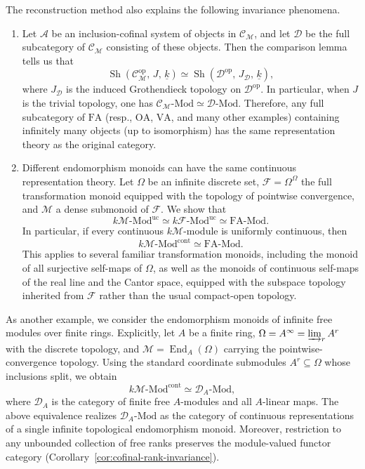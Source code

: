 \documentclass[10pt, reqno]{amsart}
\theoremstyle{plain}
\numberwithin{equation}{section}
\theoremstyle{definition}
\newcommand{\End}{\operatorname{End}}
\newcommand{\Sh}{\operatorname{Sh}}
\newcommand{\Mod}{{\textrm{-}\mathrm{Mod}}}
\newcommand{\op}{\mathrm{op}}
\newcommand{\FA}{\mathrm{FA}}
\newcommand{\M}{\mathscr M}
\newcommand{\C}{\mathscr C}
\newcommand{\D}{\mathscr D}
\begin{document}
The reconstruction method also explains the following invariance phenomena.
\begin{enumerate}
\item Let $\mathcal{A}$ be an inclusion-cofinal system of objects in $\C_\M$, and let $\D$ be the full subcategory of $\C_\M$ consisting of these objects. Then the comparison lemma tells us that
\[
\Sh(\C_\M^{\op}, \, J, \, \underline{k}) \simeq \Sh(\D^{\op}, \, J_{\D}, \, \underline{k}),
\]
where $J_{\D}$ is the induced Grothendieck topology on $\D^{\op}$. In particular, when $J$ is the trivial topology, one has $\C_\M \Mod \simeq \D \Mod$. Therefore, any full subcategory of $\mathrm{FA}$ (resp., $\mathrm{OA}$, $\mathrm{VA}$, and many other examples) containing infinitely many objects (up to isomorphism) has the same representation theory as the original category.

\item Different endomorphism monoids can have the same continuous representation theory. Let $\Omega$ be an infinite discrete set, $\mathscr{F}=\Omega^\Omega$ the full transformation monoid equipped with the topology of pointwise convergence, and $\M$ a dense submonoid of $\mathscr{F}$. We show that
\[
k\M \Mod^{\mathrm{uc}} \simeq k\mathscr{F} \Mod^{\mathrm{uc}} \simeq \FA \Mod.
\]
In particular, if every continuous $k\M$-module is uniformly continuous, then
\[
k\M \Mod^{\mathrm{cont}} \simeq \FA \Mod.
\]
This applies to several familiar transformation monoids, including the monoid of all surjective self-maps of $\Omega$, as well as the monoids of continuous self-maps of the real line and the Cantor space, equipped with the subspace topology inherited from $\mathscr{F}$ rather than the usual compact-open topology.
\end{enumerate}

As another example, we consider the endomorphism monoids of infinite free modules over finite rings. Explicitly, let $A$ be a finite ring, $\Omega = A^\infty = \varinjlim_r A^r$ with the discrete topology, and $\M = \End_A(\Omega)$ carrying the pointwise-convergence topology. Using the standard coordinate submodules $A^r \subseteq \Omega$ whose inclusions split, we obtain
\[
k\M \Mod^{\mathrm{cont}} \simeq \D_A \Mod,
\]
where $\D_A$ is the category of finite free $A$-modules and all $A$-linear maps. The above equivalence realizes $\D_A \Mod$ as the category of continuous representations of a single infinite topological endomorphism monoid. Moreover, restriction to any unbounded collection of free ranks preserves the module-valued functor category (Corollary~\ref{cor:cofinal-rank-invariance}).
\end{document}
